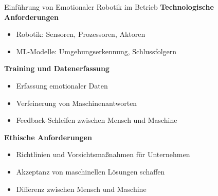 \documentclass[aspectratio=169]{beamer}
\begin{document}
\begin{frame}{Einführung von Emotionaler Robotik im Betrieb}
  \textbf{Technologische Anforderungen}
  \begin{itemize}
    \item Robotik: Sensoren, Prozessoren, Aktoren
    \item ML-Modelle: Umgebungserkennung, Schlussfolgern
  \end{itemize}
  \vspace{.5cm}

  \textbf{Training und Datenerfassung}
  \begin{itemize}
    \item Erfassung emotionaler Daten
    \item Verfeinerung von Maschinenantworten
    \item Feedback-Schleifen zwischen Mensch und Maschine
  \end{itemize}
  \vspace{.5cm}

  \textbf{Ethische Anforderungen}
  \begin{itemize}
    \item Richtlinien und Vorsichtsmaßnahmen für Unternehmen
    \item Akzeptanz von maschinellen Lösungen schaffen
    \item Differenz zwischen Mensch und Maschine
  \end{itemize}
\end{frame}
\end{document}

